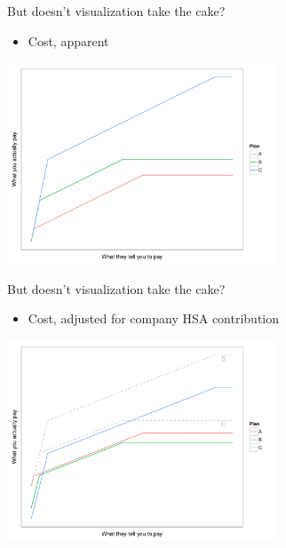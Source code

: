 \documentclass[sans,aspectratio=169,presentation,bigger,fleqn]{beamer}
\begin{document}
\begin{frame}[label=sec-12]{But doesn't visualization take the cake?}
\begin{itemize}
\item Cost, apparent
\end{itemize}

\begin{center}
\includegraphics[height=6cm]{./img/ins-apparent.pdf}
\end{center}
\end{frame}
\begin{frame}[label=sec-13]{But doesn't visualization take the cake?}
\begin{itemize}
\item Cost, adjusted for company HSA contribution
\end{itemize}

\begin{center}
\includegraphics[height=6cm]{./img/ins-adjusted.pdf}
\end{center}
\end{frame}
\end{document}
